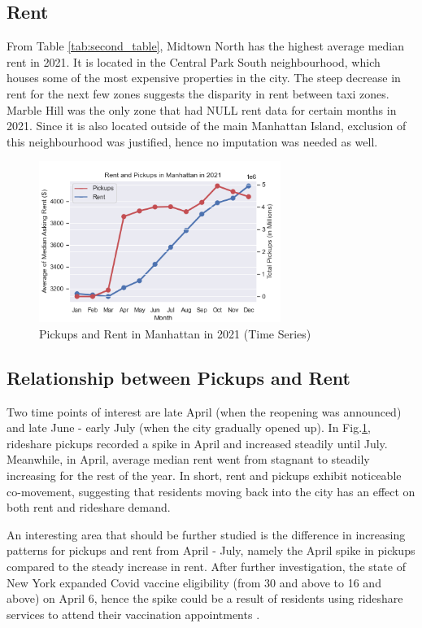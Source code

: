\documentclass[11pt]{article}
\begin{document}
\subsection{Rent}
From Table \ref{tab:second_table}, Midtown North has the highest average median rent in 2021. It is located in the Central Park South neighbourhood, which houses some of the most expensive properties in the city. The steep decrease in rent for the next few zones suggests the disparity in rent between taxi zones. Marble Hill was the only zone that had NULL rent data for certain months in 2021. Since it is also located outside of the main Manhattan Island, exclusion of this neighbourhood was justified, hence no imputation was needed as well.
\begin{figure}[h]
    \includegraphics[width=0.7\textwidth]{plots/rent_pickups.png}
    \centering
    \caption{Pickups and Rent in Manhattan in 2021 (Time Series)}
    \label{fig:2}
\end{figure}

\subsection{Relationship between Pickups and Rent}

Two time points of interest are late April (when the reopening was announced) and late June - early July (when the city gradually opened up). In Fig.\ref{fig:2}, rideshare pickups recorded a spike in April and increased steadily until July. Meanwhile, in April, average median rent went from stagnant to steadily increasing for the rest of the year.  In short, rent and pickups exhibit noticeable co-movement, suggesting that residents moving back into the city has an effect on both rent and rideshare demand. 

An interesting area that should be further studied is the difference in increasing patterns for pickups and rent from April - July, namely the April spike in pickups compared to the steady increase in rent. After further investigation, the state of New York expanded Covid vaccine eligibility (from 30 and above to 16 and above) on April 6, hence the spike could be a result of residents using rideshare services to attend their vaccination appointments \cite{cuomo}.
\end{document}
